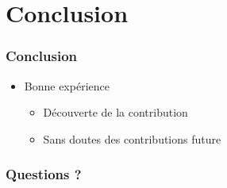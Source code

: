 \documentclass{beamer}
\begin{document}
\section{Conclusion}
\begin{frame}
  \frametitle{Conclusion}
  \begin{itemize}
  \item Bonne expérience
    \begin{itemize}
    \item Découverte de la contribution
    \item Sans doutes des contributions future
    \end{itemize}
  \end{itemize}
\end{frame}

\begin{frame}
  \frametitle{Questions ?}
\end{frame}
\end{document}
